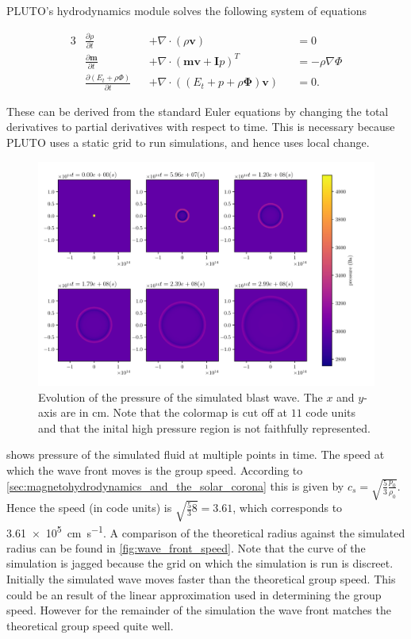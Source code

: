 \documentclass[a4paper]{article}
\let\oldcap\caption
\renewcommand{\caption}[1]{\parbox{.9\linewidth}{\oldcap{#1}}}
\begin{document}
PLUTO's hydrodynamics module solves the following system of equations

\begin{alignat}{3}
    &\frac{\partial \rho}{\partial t} &&+ \nabla \cdot (\rho \mathbf v) &&= 0 \tag{mass}\label{masscont}\\
    &\frac{\partial \mathbf m}{\partial t} &&+  \nabla \cdot (\mathbf{mv + I}p)^T &&= -\rho \nabla \Phi \tag{moment}\label{cauchymoment}\\
    &\frac{\partial(E_t + \rho \Phi)}{\partial t} &&+ \nabla \cdot ((E_t + p +\rho\mathbf{\Phi})\mathbf{v}) &&= 0 \tag{energy}\label{energy}.
\end{alignat}

These can be derived from the standard Euler equations by changing the total derivatives to partial derivatives with respect to time. This is necessary because PLUTO uses a static grid to run simulations, and hence uses local change. 
\begin{figure}[h]
	\centering
	\includegraphics[width=\textwidth]{figures/blast_wave.pdf}
	\caption{Evolution of the pressure of the simulated blast wave. The $x$ and $y$-axis are in \si{cm}. Note that the colormap is cut off at $11$ code units and that the inital high pressure region is not faithfully represented.}
	\label{fig:blastwave}
\end{figure}

 shows pressure of the simulated fluid at multiple points in time. 
The speed at which the wave front moves is the group speed. 
According to \cref{sec:magnetohydrodynamics_and_the_solar_corona} this is given by $c_s = \sqrt{\frac{5}{3} \frac{p_0}{\rho_0}} $.
Hence the speed (in code units) is $\sqrt{\frac{5}{3}8} = 3.61$, which corresponds to \SI{3.61e5}{\centi\metre\per\second}.
A comparison of the theoretical radius against the simulated radius can be found in \cref{fig:wave_front_speed}. 
Note that the curve of the simulation is jagged because the grid on which the simulation is run is discreet. 
Initially the simulated wave moves faster than the theoretical group speed. 
This could be an result of the linear approximation used in determining the group speed.
However for the remainder of the simulation the wave front matches the theoretical group speed quite well.
\end{document}
